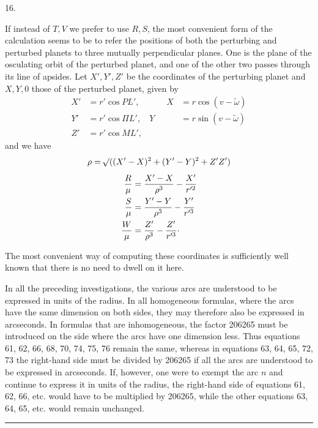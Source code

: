 \par{}\bigskip
{}
\begin{center}16.\end{center}
\noindent\hspace*{\parindent}If instead of \(T,V\) we prefer to use \(R,S\), the most convenient form of the calculation seems to be to refer the positions of both the perturbing and perturbed planets to three mutually perpendicular planes. One is the plane of the osculating orbit of the perturbed planet, and one of the other two passes through its line of apsides. Let \(X',Y',Z'\) be the coordinates of the perturbing planet and \(X,Y,0\) those of the perturbed planet, given by
\[
\begin{aligned}
X'&=r'\cos PL',&\qquad X&=r\cos(v-\tilde\omega)\\
Y'&=r'\cos\Pi L',&Y&=r\sin(v-\tilde\omega)\\
Z'&=r'\cos ML',&&
\end{aligned}
\]
and we have
\[
\begin{gathered}
\rho=\mathord{{}^{}\!\surd}((X'-X)^2+(Y'-Y)^2+Z'Z')\\[4pt]
\begin{aligned}
\dfrac{R}{\mu}&=\dfrac{X'-X}{\rho^3}-\dfrac{X'}{r'^2}\\
\dfrac{S}{\mu}&=\dfrac{Y'-Y}{\rho^3}-\dfrac{Y'}{r'^3}\\
\dfrac{W}{\mu}&=\dfrac{Z'}{\rho^3}-\dfrac{Z'}{r'^3}\mathpunct{\cdot}
\end{aligned}
\end{gathered}
\]
\par The most convenient way of computing these coordinates is sufficiently well known that there is no need to dwell on it here.
\par In all the preceding investigations, the various arcs are understood to be expressed in units of the radius. In all homogeneous formulas, where the arcs have the same dimension on both sides, they may therefore also be expressed in arcseconds. In formulas that are inhomogeneous, the factor 206265 must be introduced on the side where the arcs have one dimension less. Thus equations 61, 62, 66, 68, 70, 74, 75, 76 remain the same, whereas in equations 63, 64, 65, 72, 73 the right-hand side must be divided by 206265 if all the arcs are understood to be expressed in arcseconds. If, however, one were to exempt the arc \(n\) and continue to express it in units of the radius, the right-hand side of equations 61, 62, 66, etc. would have to be multiplied by 206265, while the other equations 63, 64, 65, etc. would remain unchanged.
\par\medskip\begin{center}\rule{4em}{.4pt}\end{center}
